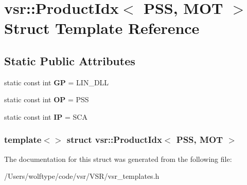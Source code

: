 \hypertarget{structvsr_1_1_product_idx_3_01_p_s_s_00_01_m_o_t_01_4}{\section{vsr\-:\-:Product\-Idx$<$ P\-S\-S, M\-O\-T $>$ Struct Template Reference}
\label{structvsr_1_1_product_idx_3_01_p_s_s_00_01_m_o_t_01_4}
}
\subsection*{Static Public Attributes}
\begin{DoxyCompactItemize}
\item 
\hypertarget{structvsr_1_1_product_idx_3_01_p_s_s_00_01_m_o_t_01_4_a8bf6088168dbe092753d8f859d64572c}{static const int {\bfseries G\-P} = L\-I\-N\-\_\-\-D\-L\-L}\label{structvsr_1_1_product_idx_3_01_p_s_s_00_01_m_o_t_01_4_a8bf6088168dbe092753d8f859d64572c}

\item 
\hypertarget{structvsr_1_1_product_idx_3_01_p_s_s_00_01_m_o_t_01_4_a24eb3ffe2d6cab25d3f0261f83100506}{static const int {\bfseries O\-P} = P\-S\-S}\label{structvsr_1_1_product_idx_3_01_p_s_s_00_01_m_o_t_01_4_a24eb3ffe2d6cab25d3f0261f83100506}

\item 
\hypertarget{structvsr_1_1_product_idx_3_01_p_s_s_00_01_m_o_t_01_4_a498a55e937b1db0794a8adf68d0e0131}{static const int {\bfseries I\-P} = S\-C\-A}\label{structvsr_1_1_product_idx_3_01_p_s_s_00_01_m_o_t_01_4_a498a55e937b1db0794a8adf68d0e0131}

\end{DoxyCompactItemize}
\subsubsection*{template$<$$>$ struct vsr\-::\-Product\-Idx$<$ P\-S\-S, M\-O\-T $>$}



The documentation for this struct was generated from the following file\-:\begin{DoxyCompactItemize}
\item 
/\-Users/wolftype/code/vsr/\-V\-S\-R/vsr\-\_\-templates.\-h\end{DoxyCompactItemize}
